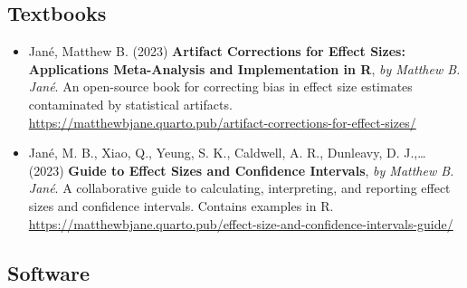 \documentclass[
  letterpaper,
  DIV=11,
  numbers=noendperiod]{scrartcl}
\begin{document}
\hypertarget{textbooks}{%
\subsection{\texorpdfstring{ Textbooks}{ Textbooks}}\label{textbooks}}

\begin{itemize}
\item
  Jané, Matthew B. (2023) \textbf{Artifact Corrections for Effect Sizes:
  Applications Meta-Analysis and Implementation in R}, \emph{by Matthew
  B. Jané}. An open-source book for correcting bias in effect size
  estimates contaminated by statistical artifacts.
  \url{https://matthewbjane.quarto.pub/artifact-corrections-for-effect-sizes/}
\item
  Jané, M. B., Xiao, Q., Yeung, S. K., Caldwell, A. R., Dunleavy, D.
  J.,\ldots{} (2023) \textbf{Guide to Effect Sizes and Confidence
  Intervals}, \emph{by Matthew B. Jané}. A collaborative guide to
  calculating, interpreting, and reporting effect sizes and confidence
  intervals. Contains examples in R.
  \url{https://matthewbjane.quarto.pub/effect-size-and-confidence-intervals-guide/}
\end{itemize}

\hypertarget{software}{%
\subsection{\texorpdfstring{ Software}{ Software}}\label{software}}
\end{document}
